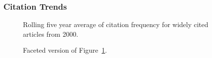 \documentclass[
  10pt,
  letterpaper,
  DIV=11,
  numbers=noendperiod,
  twoside]{scrartcl}
\begin{document}
\subsubsection*{Citation Trends}\label{sec-trends-2000}

\begin{figure}


\caption{\label{fig-citation-spaghetti-2000}Rolling five year average of
citation frequency for widely cited articles from 2000.}

\end{figure}%

\begin{figure}


\caption{\label{fig-citation-facet-2000}Faceted version of
Figure~\ref{fig-citation-spaghetti-2000}.}

\end{figure}%
\end{document}
